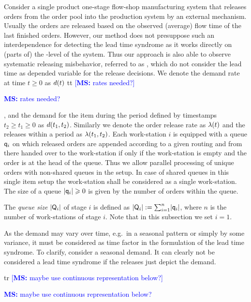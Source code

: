 \documentclass[mnsc]{informs3}
\newcommand\MS[2][r]{\ifx t#1 \textcolor{blue}{[\textbf{MS:} #2]}
  \else \begin{center}\textcolor{blue}{\textbf{MS:} #2} \end{center} \fi}
\begin{document}
Consider a single product one-stage flow-shop manufacturing system that releases orders from the
order pool into the production system by an external mechanism.
%
Usually the orders are released based on the observed (average) flow time of the last finished
orders. However, our method does not presuppose such an interdependence for detecting the lead time
syndrome as it works directly on (parts of) the \WIP{}-level of the system. Thus our approach is
also able to observe systematic releasing misbehavior, referred to as \LTS{}, which do not consider
the lead time as depended variable for the release decisions.
%
%
We denote the demand rate at time $t \geqslant 0$ as ${d}(t)$ \MS[t]{rates needed?}, and the demand
for the item during the period defined by timestamps $t_{2} \geqslant t_{1} \geqslant 0$ as
${d}(t_{1},t_{2})$. Similarly we denote the order release rate as ${\lambda}(t)$ and the releases within
a period as ${\lambda}(t_{1},t_{2})$. Each work-station $i$ is equipped with a queue $\mathsf{q}_{i}$ on which
released orders are appended according to a given routing and from there handed over to the
work-station if only if the work-station is empty and the order is at the head of the queue. Thus we
allow parallel processing of unique orders with non-shared queues in the setup. In case of shared
queues in this single item setup the work-station shall be considered as a single work-station. The
size of a queue $\lvert{\mathsf{q}_{i}}\rvert \geqslant 0$ is given by the number of orders within the queue.


\begin{definition}

  The \emph{queue size} $\lvert{\mathsf{Q}_{i}}\rvert$ of stage $i$ is defined as
  $\lvert{\mathsf{Q}_{i}}\rvert \mathrel{:=} \sum_{i=1}^{n} \lvert{\mathsf{q}_{i}}\rvert$, where $n$ is the number of work-stations of stage
  $i$. Note that in this subsection we set $i=1$.

\end{definition}


As the demand may vary over time, e.g.~in a seasonal pattern or simply by some variance, it must be
considered as time factor in the formulation of the lead time syndrome. To clarify, consider a
seasonal demand. It can clearly not be considered a lead time syndrome if the releases just depict
the demand.

\MS{maybe use continuous representation below?}
\end{document}
